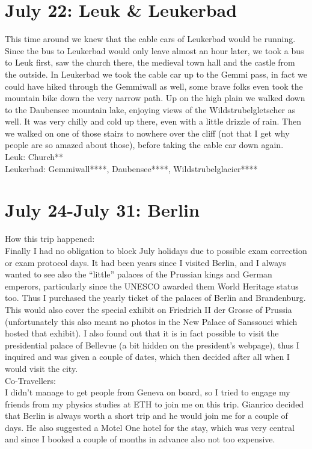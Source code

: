 \section{July 22: Leuk \& Leukerbad}
\label{Leuk2012}

This time around we knew that the cable cars of Leukerbad would be running. Since the bus to Leukerbad would only leave almost an hour later, we took a bus to Leuk first, saw the church there, the medieval town hall and the castle from the outside. In Leukerbad we took the cable car up to the Gemmi pass, in fact we could have hiked through the Gemmiwall as well, some brave folks even took the mountain bike down the very narrow path. Up on the high plain we walked down to the Daubensee mountain lake, enjoying views of the Wildstrubelgletscher as well. It was very chilly and cold up there, even with a little drizzle of rain. Then we walked on one of those stairs to nowhere over the cliff (not that I get why people are so amazed about those), before taking the cable car down again.\\

Leuk: Church**\\
Leukerbad: Gemmiwall****, Daubensee****, Wildstrubelglacier****

\section{July 24-July 31: Berlin}
\label{Berlin2012}

How this trip happened:\\
Finally I had no obligation to block July holidays due to possible exam correction or exam protocol days. It had been years since I visited Berlin, and I always wanted to see also the ``little'' palaces of the Prussian kings and German emperors, particularly since the UNESCO awarded them World Heritage status too. Thus I purchased the yearly ticket of the palaces of Berlin and Brandenburg. This would also cover the special exhibit on Friedrich II der Grosse of Prussia (unfortunately this also meant no photos in the New Palace of Sanssouci which hosted that exhibit). I also found out that it is in fact possible to visit the presidential palace of Bellevue (a bit hidden on the president's webpage), thus I inquired and was given a couple of dates, which then decided after all when I would visit the city.\\

Co-Travellers:\\
I didn't manage to get people from Geneva on board, so I tried to engage my friends from my physics studies at ETH to join me on this trip. Gianrico decided that Berlin is always worth a short trip and he would join me for a couple of days. He also suggested a Motel One hotel for the stay, which was very central and since I booked a couple of months in advance also not too expensive.\\

